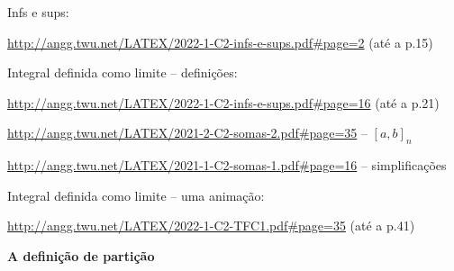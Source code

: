 \documentclass[oneside,12pt]{article}
\begin{document}
\ssk


Infs e sups:

{\scriptsize

\url{http://angg.twu.net/LATEX/2022-1-C2-infs-e-sups.pdf\#page=2} (até a p.15)

}

\ssk

Integral definida como limite -- definições:

{\scriptsize

\url{http://angg.twu.net/LATEX/2022-1-C2-infs-e-sups.pdf\#page=16} (até a p.21)

\url{http://angg.twu.net/LATEX/2021-2-C2-somas-2.pdf\#page=35} -- $[a,b]_n$

\url{http://angg.twu.net/LATEX/2021-1-C2-somas-1.pdf\#page=16} -- simplificações

}

\ssk

Integral definida como limite -- uma animação:

{\scriptsize

\url{http://angg.twu.net/LATEX/2022-1-C2-TFC1.pdf\#page=35} (até a p.41)

}



\newpage

{\bf A definição de partição}
\end{document}
